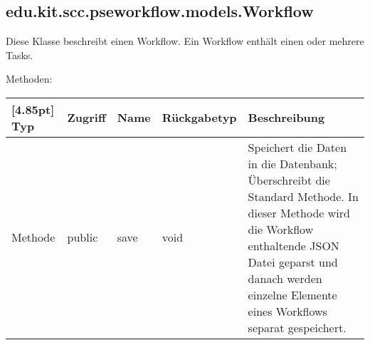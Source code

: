        \subsection{edu.kit.scc.pseworkflow.models.Workflow}
	        Diese Klasse beschreibt einen Workflow. Ein Workflow enthält einen oder mehrere Tasks.
	        
	        Methoden:
	        \begin{center}
	        	\setlength\tabcolsep{5pt}
	        	\renewcommand{\arraystretch}{1.5}
	        	
	        	\begin{tabularx}{\textwidth}{|l|l|l|l|X|}
	        		\hline
	        		\rowcolor[gray]{0.75}[4.85pt]
	        		Typ & Zugriff & Name & Rückgabetyp & Beschreibung \\ \hline 
	        		Methode & public & save & void & Speichert die Daten in die Datenbank; Überschreibt die Standard Methode. In dieser Methode wird die Workflow enthaltende JSON Datei geparst und danach werden einzelne Elemente eines Workflows separat gespeichert. \\ 
	        		\hline
	        	\end{tabularx}
	        \end{center}
                    
